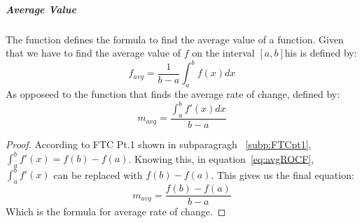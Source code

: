 \documentclass{article} %
\theoremstyle{theorem}
\theoremstyle{definition}
\begin{document}
                \subparagraph{Average Value}
                The function defines the formula to find the average value of a function. Given that we have to find the average value of $f$ on the interval $[a,b]$his is defined by: 
                    \begin{equation}
                        f_{avg}=\frac{1}{b-a}\int_{a}^{b}f(x)dx
                        \label{eq:avgValF}
                    \end{equation}
                As opposeed to the function that finds the average rate of change, defined by:
                \begin{equation}
                    \label{eq:avgROCF}
                    m_{avg}=\dfrac{\int_a^bf'(x)dx}{b-a}
                \end{equation}
                \begin{proof}
                    According to FTC Pt.1 shown in subparagragh ~\ref{subp:FTCpt1}, $\int_a^bf'(x) = f(b)-f(a)$.
                    Knowing this, in equation~\ref{eq:avgROCF}, $\int_a^bf'(x)$ can be replaced with $f(b)-f(a)$. This gives us the final equation:
                    \[
                        m_{avg}=\frac{f(b)-f(a)}{b-a}
                    \]
                    Which is the formula for average rate of change.
                \end{proof}
\end{document}
